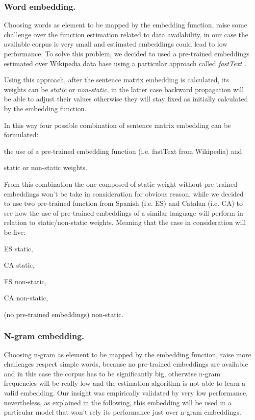 \subsubsection{Word embedding.}
Choosing words as element to be mapped by the embedding function, raise some challenge over the function estimation related to data availability, in our case the available corpus is very small and estimated embeddings could lead to low performance.
To solve this problem, we decided to used a pre-trained embeddings estimated over Wikipedia data base using a particular approach called \emph{fastText} \cite{bojanowski2016enriching}.

Using this approach, after the sentence matrix embedding is calculated, its weights can be \emph{static} or \emph{non-static}, in the latter case backward propagation will be able to adjust their values otherwise they will stay fixed as initially calculated by the embedding function.

In this way four possible combination of sentence matrix embedding can be formulated: 
\begin{enumerate*}
\item the use of a pre-trained embedding function (i.e. fastText from Wikipedia) and
\item static or non-static weights.
\end{enumerate*}
From this combination the one composed of static weight without pre-trained embeddings won't be take in consideration for obvious reason, while we decided to use two pre-trained function from Spanish (i.e. ES) and Catalan (i.e. CA) to see how the use of pre-trained embeddings of a similar language will perform in relation to static/non-static weights.
Meaning that the case in consideration will be five:
\begin{enumerate*}
\item ES static,
\item CA static,
\item ES non-static,
\item CA non-static,
\item (no pre-trained embeddings) non-static.
\end{enumerate*}

\subsubsection{N-gram embedding.}
Choosing n-gram as element to be mapped by the embedding function, raise more challenges respect simple words, because no pre-trained embeddings are available and in this case the corpus has to be significantly big, otherwise n-gram frequencies will be really low and the estimation algorithm is not able to learn a valid embedding.
Our insight was empirically validated by very low performance, nevertheless, as explained in the following, this embedding will be used in a particular model that won't rely its performance just over n-gram embeddings.


